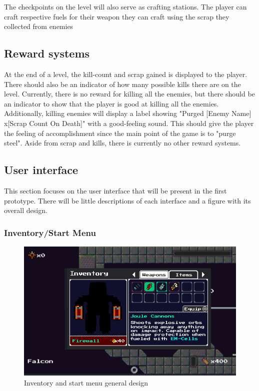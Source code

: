 \documentclass[../Main.tex]{subfiles}
\begin{document}
The checkpoints on the level will also serve as crafting stations. The player can craft respective fuels for their weapon they can craft using the scrap they collected from enemies

\subsection{Reward systems}

At the end of a level, the kill-count and scrap gained is displayed to the player. There should also be an indicator of how many possible kills there are on the level. Currently, there is no reward for killing all the enemies, but there should be an indicator to show that the player is good at killing all the enemies. Additionally, killing enemies will display a label showing "Purged [Enemy Name] x[Scrap Count On Death]" with a good-feeling sound. This should give the player the feeling of accomplishment since the main point of the game is to "purge steel". Aside from scrap and kills, there is currently no other reward systems.

\subsection{User interface}

This section focuses on the user interface that will be present in the first prototype. There will be little descriptions of each interface and a figure with its overall design.

\subsubsection{Inventory/Start Menu}

\begin{figure}[H]
	\centering
	\includegraphics[width=\columnwidth]{Figures/InventoryUI.png}
	\caption{Inventory and start menu general design}
\end{figure}
\end{document}
